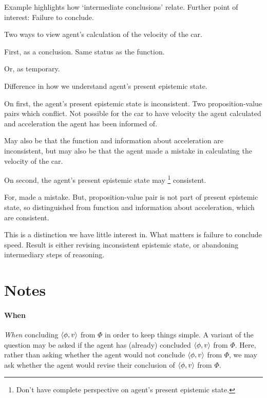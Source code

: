\begin{note}
  Example highlights how `intermediate conclusions' relate.
  Further point of interest:
  Failure to conclude.

  Two ways to view agent's calculation of the velocity of the car.

  First, as a conclusion.
  Same status as the function.

  Or, as temporary.

  Difference in how we understand agent's present epistemic state.

  On first, the agent's present epistemic state is inconsistent.
  Two proposition-value pairs which conflict.
  Not possible for the car to have velocity the agent calculated and acceleration the agent has been informed of.

  May also be that the function and information about acceleration are inconsistent, but may also be that the agent made a mistake in calculating the velocity of the car.

  On second, the agent's present epistemic state may%
  \footnote{
    Don't have complete perspective on agent's present epistemic state.
  }
  consistent.

  For, made a mistake.
  But, proposition-value pair is not part of present epistemic state, so distinguished from function and information about acceleration, which are consistent.

  This is a distinction we have little interest in.
  What matters is failure to conclude speed.
  Result is either revising inconsistent epistemic state, or abandoning intermediary steps of reasoning.
\end{note}

\section{Notes}
\label{cha:zS:sec:notes}

\paragraph*{When}

\begin{note}
  \emph{When} concluding \(\langle \phi, v \rangle\) from \(\Phi\) in order to keep things simple.
  A variant of the question may be asked if the agent has (already) concluded \(\langle \phi, v \rangle\) from \(\Phi\).
  Here, rather than asking whether the agent would not conclude \(\langle \phi, v \rangle\) from \(\Phi\), we may ask whether the agent would revise their conclusion of \(\langle \phi, v \rangle\) from \(\Phi\).
\end{note}

